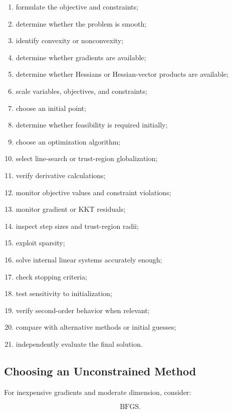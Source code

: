 \begin{enumerate}
    \item formulate the objective and constraints;
    \item determine whether the problem is smooth;
    \item identify convexity or nonconvexity;
    \item determine whether gradients are available;
    \item determine whether Hessians or Hessian-vector products are
          available;
    \item scale variables, objectives, and constraints;
    \item choose an initial point;
    \item determine whether feasibility is required initially;
    \item choose an optimization algorithm;
    \item select line-search or trust-region globalization;
    \item verify derivative calculations;
    \item monitor objective values and constraint violations;
    \item monitor gradient or KKT residuals;
    \item inspect step sizes and trust-region radii;
    \item exploit sparsity;
    \item solve internal linear systems accurately enough;
    \item check stopping criteria;
    \item test sensitivity to initialization;
    \item verify second-order behavior when relevant;
    \item compare with alternative methods or initial guesses;
    \item independently evaluate the final solution.
\end{enumerate}

\subsection{Choosing an Unconstrained Method}
\label{subsec:choosing-unconstrained-method}

For inexpensive gradients and moderate dimension, consider:

\[
\boxed{
\text{BFGS}.
}
\]


